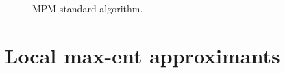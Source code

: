 \begin{figure}\sidecaption
  \centering
  \caption{MPM standard algorithm.}
  \label{alg:PCE-algorithm}
\end{figure}

\section{Local max-ent approximants}
\label{sec:local-max-ent}

